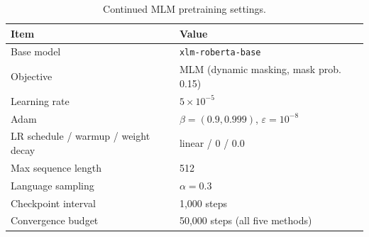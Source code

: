 \begin{table}[h]\centering\small
\caption{Continued MLM pretraining settings.}
\label{tab:mlm}
\begin{tabular}{@{}ll@{}}
\toprule
Item & Value \\
\midrule
Base model & \texttt{xlm-roberta-base} \\
Objective & MLM (dynamic masking, mask prob. 0.15) \\
Learning rate & $5\times10^{-5}$ \\
Adam & $\beta=(0.9,0.999)$, $\varepsilon=10^{-8}$ \\
LR schedule / warmup / weight decay & linear / 0 / 0.0 \\
Max sequence length & 512 \\
Language sampling & $\alpha=0.3$ \\
Checkpoint interval & 1,000 steps \\
Convergence budget & 50,000 steps (all five methods) \\
\bottomrule
\end{tabular}
\end{table}
